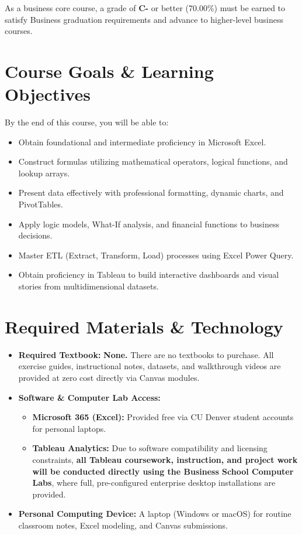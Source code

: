 \documentclass[11pt,a4paper]{article}
\begin{document}
As a business core course, a grade of \textbf{C-} or better (70.00\%) must be earned to satisfy Business graduation requirements and advance to higher-level business courses.

\section*{Course Goals \& Learning Objectives}
By the end of this course, you will be able to:
\begin{itemize}[noitemsep]
    \item Obtain foundational and intermediate proficiency in Microsoft Excel.
    \item Construct formulas utilizing mathematical operators, logical functions, and lookup arrays.
    \item Present data effectively with professional formatting, dynamic charts, and PivotTables.
    \item Apply logic models, What-If analysis, and financial functions to business decisions.
    \item Master ETL (Extract, Transform, Load) processes using Excel Power Query.
    \item Obtain proficiency in Tableau to build interactive dashboards and visual stories from multidimensional datasets.
\end{itemize}

\section*{Required Materials \& Technology}
\begin{itemize}[leftmargin=*]
    \item \textbf{Required Textbook:} \textbf{None.} There are no textbooks to purchase. All exercise guides, instructional notes, datasets, and walkthrough videos are provided at zero cost directly via Canvas modules.
    \item \textbf{Software \& Computer Lab Access:}
    \begin{itemize}[noitemsep]
        \item \textbf{Microsoft 365 (Excel):} Provided free via CU Denver student accounts for personal laptops.
        \item \textbf{Tableau Analytics:} Due to software compatibility and licensing constraints, \textbf{all Tableau coursework, instruction, and project work will be conducted directly using the Business School Computer Labs}, where full, pre-configured enterprise desktop installations are provided.
    \end{itemize}
    \item \textbf{Personal Computing Device:} A laptop (Windows or macOS) for routine classroom notes, Excel modeling, and Canvas submissions.
\end{itemize}
\end{document}
